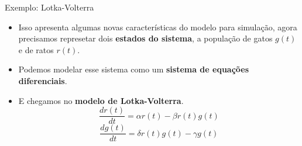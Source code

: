 \documentclass{beamer}
\begin{document}
		\begin{frame}{Exemplo: Lotka-Volterra}
			\begin{itemize}[<+->]
				\item Isso apresenta algumas novas características do modelo para simulação, agora precisamos represetar dois \textbf{estados do sistema}, a população de gatos $g(t)$ e de ratos $r(t)$.
				\item Podemos modelar esse sistema como um \textbf{sistema de equações diferenciais}.
				\item E chegamos no \textbf{modelo de Lotka-Volterra}.
				\begin{equation}
					\frac{dr(t)}{dt}=\alpha r(t) - \beta r(t)g(t)
				\end{equation}
				\begin{equation}
					\frac{dg(t)}{dt}=\delta r(t)g(t) - \gamma g(t)
				\end{equation}
			\end{itemize}
		\end{frame}
\end{document}
